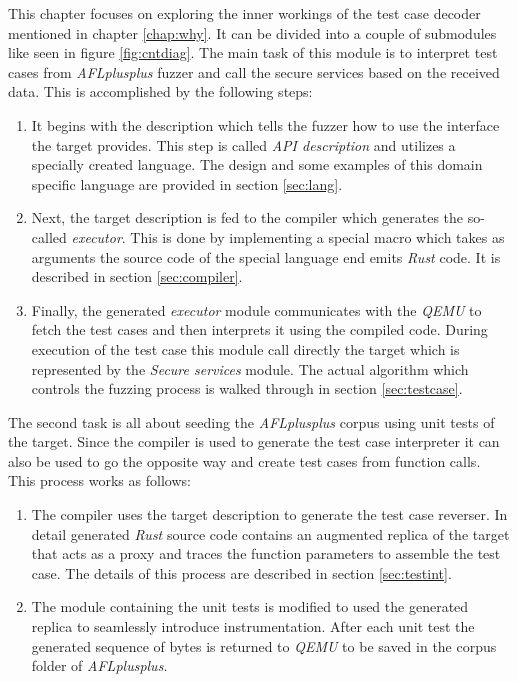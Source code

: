This chapter focuses on exploring the inner workings of the test case decoder mentioned in chapter \ref{chap:why}. It can be divided into a couple of submodules like seen in figure \ref{fig:cntdiag}. The main task of this module is to interpret test cases from \textit{AFLplusplus} fuzzer and call the secure services based on the received data. This is accomplished by the following steps:
\begin{enumerate}
    \item It begins with the description which tells the fuzzer how to use the interface the target provides. This step is called \textit{API description} and utilizes a specially created language. The design and some examples of this domain specific language are provided in section \ref{sec:lang}.
    \item Next, the target description is fed to the compiler which generates the so-called \textit{executor}. This is done by implementing a special macro which takes as arguments the source code of the special language end emits \textit{Rust} code. It is described in section \ref{sec:compiler}.
    \item Finally, the generated \textit{executor} module communicates with the \textit{QEMU} to fetch the test cases and then interprets it using the compiled code. During execution of the test case this module call directly the target which is represented by the \textit{Secure services} module. The actual algorithm which controls the fuzzing process is walked through in section \ref{sec:testcase}.
\end{enumerate}
The second task is all about seeding the \textit{AFLplusplus} corpus using unit tests of the target. Since the compiler is used to generate the test case interpreter it can also be used to go the opposite way and create test cases from function calls. This process works as follows:
\begin{enumerate}
    \item The compiler uses the target description to generate the test case reverser. In detail generated \textit{Rust} source code contains an augmented replica of the target that acts as a proxy and traces the function parameters to assemble the test case. The details of this process are described in section \ref{sec:testint}.
    \item The module containing the unit tests is modified to used the generated replica to seamlessly introduce instrumentation. After each unit test the generated sequence of bytes is returned to \textit{QEMU} to be saved in the corpus folder of \textit{AFLplusplus}.
\end{enumerate}
